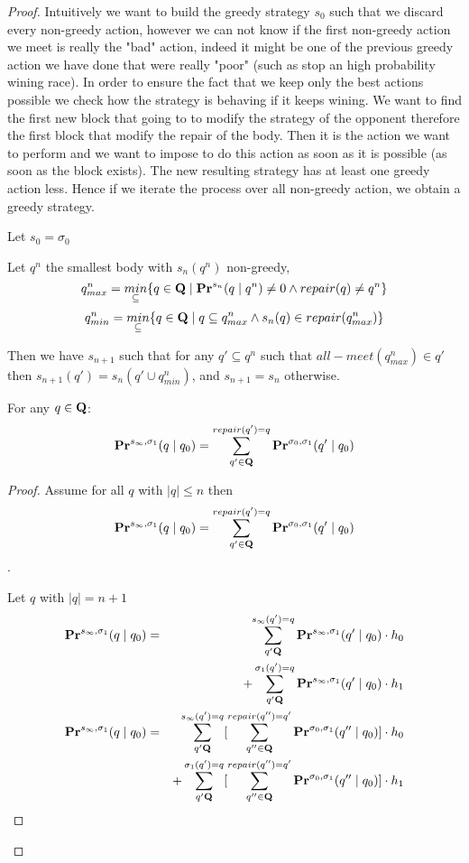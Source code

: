 \begin{proof}
	
	Intuitively we want to build the greedy strategy $s_0$ such that we discard every non-greedy action, however we can not know if the first non-greedy action we meet is really the "bad" action, indeed it might be one of the previous greedy action we have done that were really "poor" (such as stop an high probability wining race). In order to ensure the fact that we keep only the best actions possible we check how the strategy is behaving if it keeps wining. We want to find the first new block that going to to modify the strategy of the opponent therefore the first block that modify the repair of the body. Then it is the action we want to perform and we want to impose to do this action as soon as it is possible (as soon as the block exists). The new resulting strategy has at least one greedy action less. Hence if we iterate the process over all non-greedy action, we obtain a greedy strategy. 
	
	Let $s_0 = \sigma_0$
	
	Let $q^n$  the smallest body with $s_n(q^n)$ non-greedy, 
	$$q^n_{max} = \underset{\subseteq}{min}\{q \in \mathbf{Q} \mid  \mathbf{Pr}^{s_n}(q\mid q^n)\neq 0 \land repair(q) \neq q^n \}$$
	$$q^n_{min} = \underset{\subseteq}{min}\{q \in \mathbf{Q} \mid  q \subseteq q^n_{max} \land s_n(q) \in repair(q^n_{max}) \}$$
	
	
	Then we have $s_{n+1}$ such that for any $q' \subseteq q^n$ such that $all-meet(q^n_{max}) \in q'$ then $s_{n+1}(q') = s_n(q' \cup q^n_{min})$, and $s_{n+1} = s_n$ otherwise.
	
	\begin{mylem}
		\label{lemmpr}
		For any $q \in \mathbf{Q}$: 
		$$\mathbf{Pr}^{s_{\infty},\sigma_1}(q \mid q_0)  = \sum_{q'\in \mathbf{Q}}^{repair(q') = q} \mathbf{Pr}^{\sigma_0,\sigma_1}(q' \mid q_0)$$
	\end{mylem}
	\begin{proof}
		
		Assume for all $q$ with $|q| \leq n$ then $$\mathbf{Pr}^{s_{\infty},\sigma_1}(q \mid q_0)  = \sum_{q'\in \mathbf{Q}}^{repair(q') = q} \mathbf{Pr}^{\sigma_0,\sigma_1}(q' \mid q_0)$$. 
		
		Let $q$ with $|q| = n+1$
		\begin{eqnarray*}
			\mathbf{Pr}^{s_{\infty},\sigma_1}(q \mid q_0)  & =& \sum_{q' \mathbf{Q}}^{s_{\infty}(q') = q} \mathbf{Pr}^{s_{\infty},\sigma_1}(q'\mid q_0) \cdot h_0\\
			& & + \sum_{q' \mathbf{Q}}^{\sigma_1(q') = q}  \mathbf{Pr}^{s_{\infty},\sigma_1}(q'\mid q_0) \cdot h_1 \\
			\mathbf{Pr}^{s_{\infty},\sigma_1}(q \mid q_0)  & =& \sum_{q' \mathbf{Q}}^{s_{\infty}(q') = q} [ \sum_{q''\in \mathbf{Q}}^{repair(q'') = q'} \mathbf{Pr}^{\sigma_0,\sigma_1}(q'' \mid q_0)] \cdot h_0\\
			& & + \sum_{q' \mathbf{Q}}^{\sigma_1(q') = q}  [ \sum_{q''\in \mathbf{Q}}^{repair(q'') = q'} \mathbf{Pr}^{\sigma_0,\sigma_1}(q'' \mid q_0)] \cdot h_1 \\
		\end{eqnarray*}
		

\end{proof}
\end{proof}
